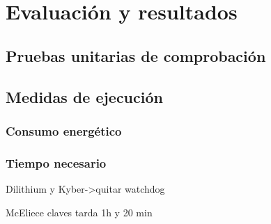%
%
%
% 
%
%
%
%

\chapter{Evaluación y resultados}\label{cha:resultados}

\section{Pruebas unitarias de comprobación}\label{sec:unitarias}



\section{Medidas de ejecución}\label{sec:medidas}

\subsection{Consumo energético}\label{subsec:energia}

\subsection{Tiempo necesario}\label{subsec:tiempo}

Dilithium y Kyber->quitar watchdog

McEliece claves tarda 1h y 20 min

